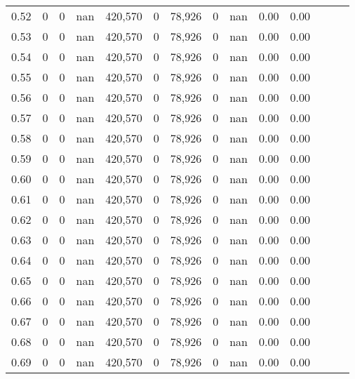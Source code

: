 \begin{tabular}{rrrrrrrrrrrrrr}
0.52 &        0 &       0 &   nan &  420,570 &        0 &  78,926 &       0 &   nan &  0.00 &      0.00 \\
0.53 &        0 &       0 &   nan &  420,570 &        0 &  78,926 &       0 &   nan &  0.00 &      0.00 \\
0.54 &        0 &       0 &   nan &  420,570 &        0 &  78,926 &       0 &   nan &  0.00 &      0.00 \\
0.55 &        0 &       0 &   nan &  420,570 &        0 &  78,926 &       0 &   nan &  0.00 &      0.00 \\
0.56 &        0 &       0 &   nan &  420,570 &        0 &  78,926 &       0 &   nan &  0.00 &      0.00 \\
0.57 &        0 &       0 &   nan &  420,570 &        0 &  78,926 &       0 &   nan &  0.00 &      0.00 \\
0.58 &        0 &       0 &   nan &  420,570 &        0 &  78,926 &       0 &   nan &  0.00 &      0.00 \\
0.59 &        0 &       0 &   nan &  420,570 &        0 &  78,926 &       0 &   nan &  0.00 &      0.00 \\
0.60 &        0 &       0 &   nan &  420,570 &        0 &  78,926 &       0 &   nan &  0.00 &      0.00 \\
0.61 &        0 &       0 &   nan &  420,570 &        0 &  78,926 &       0 &   nan &  0.00 &      0.00 \\
0.62 &        0 &       0 &   nan &  420,570 &        0 &  78,926 &       0 &   nan &  0.00 &      0.00 \\
0.63 &        0 &       0 &   nan &  420,570 &        0 &  78,926 &       0 &   nan &  0.00 &      0.00 \\
0.64 &        0 &       0 &   nan &  420,570 &        0 &  78,926 &       0 &   nan &  0.00 &      0.00 \\
0.65 &        0 &       0 &   nan &  420,570 &        0 &  78,926 &       0 &   nan &  0.00 &      0.00 \\
0.66 &        0 &       0 &   nan &  420,570 &        0 &  78,926 &       0 &   nan &  0.00 &      0.00 \\
0.67 &        0 &       0 &   nan &  420,570 &        0 &  78,926 &       0 &   nan &  0.00 &      0.00 \\
0.68 &        0 &       0 &   nan &  420,570 &        0 &  78,926 &       0 &   nan &  0.00 &      0.00 \\
0.69 &        0 &       0 &   nan &  420,570 &        0 &  78,926 &       0 &   nan &  0.00 &      0.00 \\

\end{tabular}
